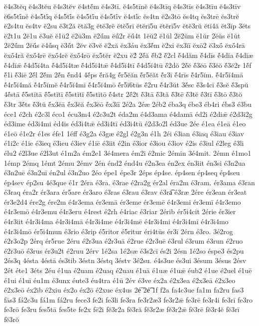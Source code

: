 {ĕ4s3tĕq
ĕ4s3tĕu
ĕ4s3tĕv
ĕ4stĕ́m
ĕ4s3tī.
ĕ4s5tīnĕ
ĕ4s3tīq
ĕ4s3tīs
ĕ4s3tīu
ĕ4s3tīv
ĕ6s5tī́nĕ
ĕ4s5tī́q
ĕ4s5tī́s
ĕ4s5tī́u
ĕ4s5tī́v
ĕ4stĭ́c
ĕs4tn
ĕ2s3tō
ĕs4tq
ĕs3trē
ĕs3trĕ
ĕ2s4tu
ĕs4tv
ĕ2su
ĕ3t2ă
ĕtă3g
ĕtĕ3rĕ
ĕtĕ5rī
ĕtĕrī5u
ĕtĕrī5v
ĕtĕ3rŭ
ĕtĭ4ă
ĕt3ĭp
3ĕts
ĕ2t1u
2ĕ1u
ĕ3uĕ
ĕ1ū2
ĕ2ū3m
ĕ2ū́m
ĕū́2r
ĕū́4t
1ĕŭ2
ĕ1ŭl
2ĕ2ŭm
ĕ1ŭr
2ĕŭs
ĕ1ŭt
2ĕ2ŭ́m
2ĕŭ́s
ĕ4ŭ́sq
ĕ3ŭ́t
2ĕv
ĕ3vĕ
ĕ2xă
ĕx3áu
ĕx3ĕ́m
ĕ2xi
ĕx3ĭī
ĕxō2
ĕ3xṓ
ĕxṓ4rā
ĕxṓ4ră
ĕxṓ4rē
ĕxṓ4rĕ
ĕxṓ4rō
ĕx5tĕr
ĕ2xu
ĕ2́
2ĕ́ă
ĕ́b2
ĕ́2cl
ĕ́4dăm
ĕ́4dīs
ĕ́4dĭa
ĕ́4dĭæ
ĕ́4dĭǣ
ĕ́4d5ĭ4ta
ĕ́4d5ĭ4tæ
ĕ́4d5ĭ4tǣ
ĕ́4d5ĭ4tī
ĕ́4d5ĭ4tū
ĕ́2dŏ
2ĕ́ĕ
ĕ́3ĕō
ĕ́3ĕŏ
ĕ́3ĕ2r
1ĕ́f
ĕ́1i
ĕ́3iē
2ĕ́l
2ĕ́m
2ĕ́n
ĕ́nd4
4ĕ́ps
ĕ́ră4g
ĕ́r5ĕăn
ĕ́r5ĕăt
ĕ́r3ī
ĕ́4rīs
ĕ́4r5ĭm.
ĕ́4r5ĭ4mā
ĕ́4r5ĭ4mă
ĕ́4r5ĭmĕ
ĕ́4r5ĭ4mī
ĕ́4r5ĭ4mō
ĕ́r5ĭ6tūs
ĕ́2ru
ĕ́4r3ŭt
3ĕ́sc
ĕ́3s4cī
ĕ́3sĕ
ĕ́3spŭ
4ĕ́stā
ĕ́5stĭtā
ĕ́5stĭtī
ĕ́5stĭtĭ
ĕ́5stĭtō
ĕ́4str
2ĕ́2t
ĕ́3tā
ĕ́3tă
ĕ́3tē
ĕ́3tĕ
ĕ́3tī
ĕ́3tō
ĕ́3tŏ
ĕ́3tr
3ĕ́ts
ĕ́3tŭ
ĕ́x3ĕā
ĕ́x3ĕă
ĕ́x3ĕō
ĕ́x3ĭī
2é2a
2éæ
2éb2
éba3q
ébe3
éb4ri
ébs3
é3bu
éce1
é2ch
é2c3l
éco1
écu3m4
é2c3u2t
éda2m
é4d3ama
é4damā
éd2i
é2diǣ
é2d3i2g
éd3ime
éd3i4mi
éd4is
éd3i4tǣ
éd3i4tī
éd3i4tū
é2d3o2l
éd3ue
2ée
é1ea
é1eā
é1eo
é1eō
é1e2r
é1es
éfe1
1éff
é3g2a
é3gæ
é2gl
é2g3n
é1h
2éi
é3ian
é3iaq
é3iau
é3iav
é1i2c
é1ie
é3ieq
é3ieu
é3iev
é1iē
é3iit
é2in
é3ior
é3iou
é3iov
é2is
é3iul
é2leg
é3li
élu2
é2l3ue
é2l3ut
é1m2a
ém2e1
3é4mera
ém2i
é2mic
2émin
3é4mit.
2émn
é1mo1
1émp
2émq
1émt
2ému
2émv
2én
énd2
énd4u
é2n3ea
én2ex
én3iit
én3si
é3n2ua
é3n2uē
é3n2uī
én2ul
é3n2uo
2éo
épe1
épe3r
2éps
ép4se.
ép4sen
ép4seq
ép4seu
ép4sev
ép2su
4é3que
é1r
2éra
é3ra.
é3rae
é2ra2g
ér2al
éra2m
é3ram.
ér3ama
é3ran
é3raq
éra2r
ér3ara
ér5are
ér3aro
é3ras
é3rau
é3rav
é3ra͡
é3ræ
2ére
ér3ean
ér3eat
ér3e2d4
ére2g
ére2m
é4r3ema
ér3emā
ér3eme
ér3emē
é4r3emi
ér3emī
é4r3emo
é4r3emō
é4r3emu
é4r3eru
é4rest
é2rh
é4riac
é3riar
2érib
ér5i4cit
2érie
ér3ier
é4r3iit
é4r3i4ma
é4r3i4mā
é4r3i4me
é4r3i4mē
é4r3i4mi
é4r3i4mī
é4r3i4mo
é4r3i4mō
ér5i4mun
é3rio
é3rip
é5ritor
é5ritur
éri4tūs
ér3ī
2érn
é3ro.
3é2rog
é2r3o2p
2érq
ér5rue
2éru
é2r3ua
é2r3uā
é2rue
é2r3uē
é3rul
é3rum
é3run
é2ruo
é2r3uō
é3rus
ér3u2t
é2ruu
2érv
1é2sa
1é2sæ
é3s2cī
és2i
2ésn
1é2so
éspe3
és2pu
2és3q
4ésta
4éstā
és3tib
3éstn
3éstq
3éstv
3é2su.
é4s3ue
és3ui
3ésum
3ésus
2ésv
2ét
éte1
3éts
2éu
é1ua
é2uam
é2uaq
é2uau
é1uā
é1uæ
é1uǣ
éub2
é1ue
é2uel
é1uē
é1ui
é1uī
éu1m
é3unx
éute3
éu4tra
é1ū
2év
é3ve
éx2a
é2x3ea
é2x3eā
é2x3eo
é2x3eō
éx2ib
é2xiu
éx2o
éx2ō
é2xue
éx4us
2é͞
2é͡
1f
f2a
fa4c3ue
fa1m
fa2ru
fas3
fās3
fá2c3u
fá1m
fá2ru
fece3
fe2i
fe3li
fe3ra
fe3r2æ3
fe3r2ǣ
fe3rē
fe3r4i
fe3rī
fe3ro
fe3rō
fe3ru
fes5tā
fes5te
fe2x
fē2i
fĕ3r2a
fĕ3ră
fĕ3r2æ
fĕ3r2ǣ
fĕ3rē
fĕ3r4ĕ
fĕ3rī
fĕ3rŏ
}
